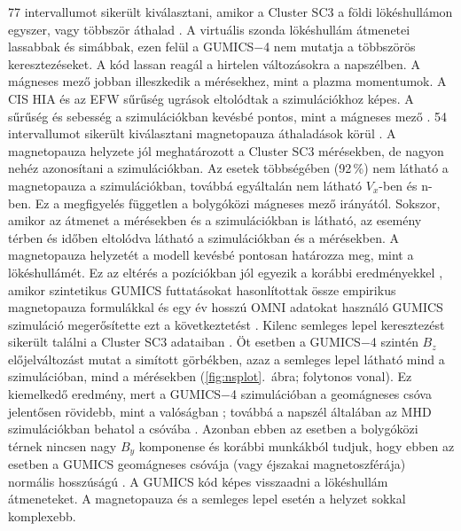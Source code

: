 \documentclass[b5paper,10pt]{article}
\begin{document}
77 intervallumot sikerült kiválasztani, amikor a Cluster SC3 a földi lökéshullámon egyszer, vagy többször áthalad \cite{facsko21:_compar_gumic_terres_magnet_clust_measur}. A virtuális szonda lökéshullám átmenetei lassabbak és simábbak, ezen felül a GUMICS$-$4 nem mutatja a többszörös keresztezéseket. A kód lassan reagál a hirtelen változásokra a napszélben. A mágneses mező jobban illeszkedik a mérésekhez, mint a plazma momentumok. A CIS HIA és az EFW sűrűség ugrások eltolódtak a szimulációkhoz képes. A sűrűség és sebesség a szimulációkban kevésbé pontos, mint a mágneses mező \cite{facsko21:_compar_gumic_terres_magnet_clust_measur}. 54 intervallumot sikerült kiválasztani magnetopauza áthaladások körül \cite{facsko21:_compar_gumic_terres_magnet_clust_measur}. A magnetopauza helyzete jól meghatározott a Cluster SC3 mérésekben, de nagyon nehéz azonosítani a szimulációkban. Az esetek többségében (92\,\%) nem látható a magnetopauza a szimulációkban, továbbá egyáltalán nem látható $V_{x}$-ben és n-ben. Ez a megfigyelés független a bolygóközi mágneses mező irányától. Sokszor, amikor az átmenet a mérésekben és a szimulációkban is látható, az esemény térben és időben eltolódva látható a szimulációkban és a mérésekben. A magnetopauza helyzetét a modell kevésbé pontosan határozza meg, mint a lökéshullámét. Ez az eltérés a pozíciókban jól egyezik a korábbi eredményekkel \cite{gordeev13:_verif_gumic_mhd,facsko16:_one_earth}, amikor szintetikus GUMICS futtatásokat hasonlítottak össze empirikus magnetopauza formulákkal \cite{gordeev13:_verif_gumic_mhd} és egy év hosszú OMNI adatokat használó GUMICS szimuláció \cite{facsko16:_one_earth} megerősítette ezt a következtetést \cite{facsko21:_compar_gumic_terres_magnet_clust_measur}. Kilenc semleges lepel keresztezést sikerült találni a Cluster SC3 adataiban \cite{facsko21:_compar_gumic_terres_magnet_clust_measur}. Öt esetben a GUMICS$-$4 szintén $B_{z}$ előjelváltozást mutat a simított görbékben, azaz a semleges lepel látható mind a szimulációban, mind a mérésekben (\ref{fig:nsplot}.~ábra; folytonos vonal). Ez kiemelkedő eredmény, mert a GUMICS$-$4 szimulációban a geomágneses csóva jelentősen rövidebb, mint a valóságban \cite{gordeev13:_verif_gumic_mhd,facsko16:_one_earth}; továbbá a napszél általában az MHD szimulációkban behatol a csóvába \cite{kallio15:_proper}. Azonban ebben az esetben a bolygóközi térnek nincsen nagy $B_{y}$ komponense és korábbi munkákból tudjuk, hogy ebben az esetben a GUMICS geomágneses csóvája (vagy éjszakai magnetoszférája) normális hosszúságú \cite{facsko16:_one_earth, facsko21:_compar_gumic_terres_magnet_clust_measur}. A GUMICS kód képes visszaadni a lökéshullám átmeneteket. A magnetopauza és a semleges lepel esetén a helyzet sokkal komplexebb.
\end{document}
